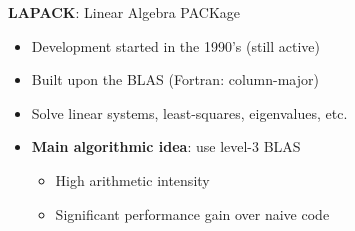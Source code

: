 \documentclass[xcolor={rgb,x11names,svgnames},rgb,x11names,svgnames]{beamer}
\newcommand{\red}{\alert}
\begin{document}
\begin{frame}[label=lapack]
  \begin{exampleblock}{\textbf{LAPACK}: Linear Algebra PACKage}
    \begin{itemize}
    \item Development started in the 1990's (still active)
    \item Built upon the BLAS (Fortran: \alert{column-major})
    \item Solve linear systems, least-squares, eigenvalues, etc.
    \item \textbf{Main algorithmic idea}: \red{use level-3 BLAS}
      \begin{itemize}
      \item High \red{arithmetic intensity}
      \item Significant performance gain over naive code
      \end{itemize}
    \end{itemize}
  \end{exampleblock}  
\end{frame}

\end{document}
